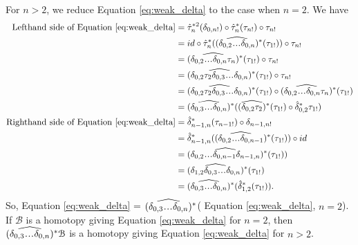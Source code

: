 For $n>2$, we reduce Equation 
\ref{eq:weak_delta} to the case when 
$n=2$. We have
\begin{align*}
\textrm{Lefthand side of Equation 
\ref{eq:weak_delta}}
&= 
\hat{\tau}_n^{*2}(\delta_{0,n!}) \circ 
  \hat{\tau}_n^*(\tau_{n!}) \circ \tau_{n!} \\  
&=  
id \circ 
  \hat{\tau}_n^*(
  (\widehat{\delta_{0,2}\smdots\delta_{0,n}})^*(\tau_{1!})) 
  \circ \tau_{n!} \\
&=   
(\widehat{\delta_{0,2}\smdots\delta_{0,n}\tau_n})^*(\tau_{1!}) 
  \circ \tau_{n!} \\
&=
(\widehat{\delta_{0,2}\tau_2\delta_{0,3}\smdots\delta_{0,n}})^*(\tau_{1!}) 
  \circ \tau_{n!} \\
&=
(\widehat{\delta_{0,2}\tau_2\delta_{0,3}\smdots\delta_{0,n}})^*(\tau_{1!}) 
  \circ (\widehat{\delta_{0,2}\smdots\delta_{0,n}\tau_n})^*(\tau_{1!}) \\
&=
(\widehat{\delta_{0,3}\smdots\delta_{0,n}})^*(
  (\widehat{\delta_{0,2}\tau_2})^*(\tau_{1!}) 
  \circ \hat{\delta}_{0,2}^*\tau_{1!}) \\ 
%
\textrm{Righthand side of Equation 
\ref{eq:weak_delta}}
&=  
\hat{\delta}_{n-1,n}^*(\tau_{n-1!}) 
  \circ \delta_{n-1,n!}\\
&=  
\hat{\delta}_{n-1,n}^*(
  (\widehat{\delta_{0,2}\smdots\delta_{0,n-1}})^*
  (\tau_{1!})) \circ id\\
&=  
(\widehat{\delta_{0,2}\smdots\delta_{0,n-1}
  \delta_{n-1,n}})^*(\tau_{1!}))\\  
&=  
(\widehat{\delta_{1,2}\delta_{0,3}\smdots\delta_{0,n}})^*
  (\tau_{1!})\\ 
&=  
(\widehat{\delta_{0,3}\smdots\delta_{0,n}})^*
  (\hat{\delta}_{1,2}^*(\tau_{1!})).
\end{align*}
So, Equation \ref{eq:weak_delta} = 
$(\widehat{\delta_{0,3}\smdots\delta_{0,n}})^*$(
Equation \ref{eq:weak_delta}, $n=2$). 
If $\mathcal{B}$ is a homotopy giving 
Equation \ref{eq:weak_delta} for $n=2$, then 
$(\widehat{\delta_{0,3}\smdots\delta_{0,n}})^*
\mathcal{B}$ is a homotopy giving Equation 
\ref{eq:weak_delta} for $n>2$.
%
